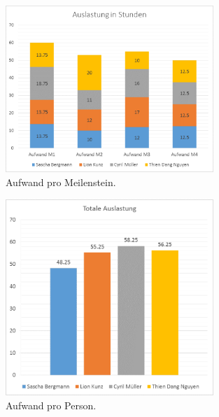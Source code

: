\begin{figure}[H]
\centering
\includegraphics[width=0.7\textwidth]{graphics/auslastung_meilensteine.png}
\caption{Aufwand pro Meilenstein.}
\end{figure}


\begin{figure}[H]
\centering
\includegraphics[width=0.7\textwidth]{graphics/auslastung_total.png}
\caption{Aufwand pro Person.}
\end{figure}
